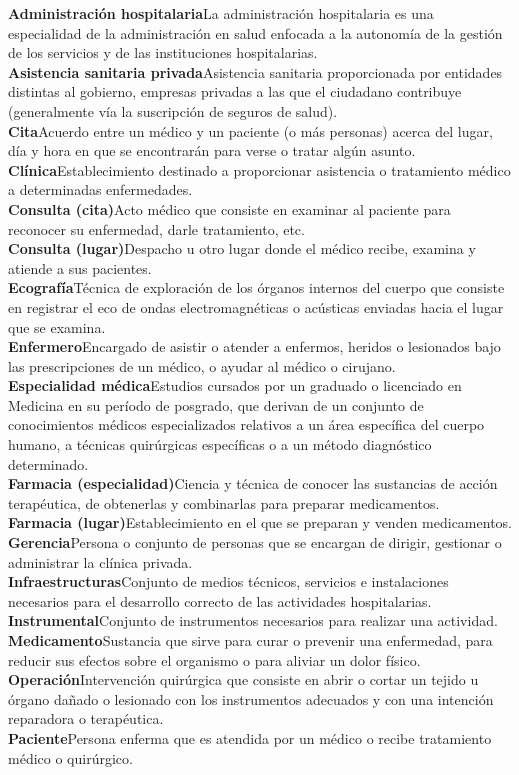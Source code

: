 \documentclass[12pt,a4paper]{article}
\newcommand{\term}[2]{\textbf{#1}\quad#2\\}
\begin{document}
	\term{Administración hospitalaria}{La administración hospitalaria es una especialidad de la administración en salud enfocada a la autonomía de la gestión de los servicios y de las instituciones hospitalarias.}
	\term{Asistencia sanitaria privada}{Asistencia sanitaria proporcionada por entidades distintas al gobierno, empresas privadas a las que el ciudadano contribuye (generalmente vía la suscripción de seguros de salud).}
	\term{Cita}{Acuerdo entre un médico y un paciente (o más personas) acerca del lugar, día y hora en que se encontrarán para verse o tratar algún asunto.}
	\term{Clínica}{Establecimiento destinado a proporcionar asistencia o tratamiento médico a determinadas enfermedades.}
	\term{Consulta (cita)}{Acto médico que consiste en examinar al paciente para reconocer su enfermedad, darle tratamiento, etc.}
	\term{Consulta (lugar)}{Despacho u otro lugar donde el médico recibe, examina y atiende a sus pacientes.}
	\term{Ecografía}{Técnica de exploración de los órganos internos del cuerpo que consiste en registrar el eco de ondas electromagnéticas o acústicas enviadas hacia el lugar que se examina.}
	\term{Enfermero}{Encargado de asistir o atender a enfermos, heridos o lesionados bajo las prescripciones de un médico, o ayudar al médico o cirujano.}
	\term{Especialidad médica}{Estudios cursados por un graduado o licenciado en Medicina en su período de posgrado, que derivan de un conjunto de conocimientos médicos especializados relativos a un área específica del cuerpo humano, a técnicas quirúrgicas específicas o a un método diagnóstico determinado.}
	\term{Farmacia (especialidad)}{Ciencia y técnica de conocer las sustancias de acción terapéutica, de obtenerlas y combinarlas para preparar medicamentos.}
	\term{Farmacia (lugar)}{Establecimiento en el que se preparan y venden medicamentos.}
	\term{Gerencia}{Persona o conjunto de personas que se encargan de dirigir, gestionar o administrar la clínica privada.}
	\term{Infraestructuras}{Conjunto de medios técnicos, servicios e instalaciones necesarios para el desarrollo correcto de las actividades hospitalarias.}
	\term{Instrumental}{Conjunto de instrumentos necesarios para realizar una actividad.}
	\term{Medicamento}{Sustancia que sirve para curar o prevenir una enfermedad, para reducir sus efectos sobre el organismo o para aliviar un dolor físico.}
	\term{Operación}{Intervención quirúrgica que consiste en abrir o cortar un tejido u órgano dañado o lesionado con los instrumentos adecuados y con una intención reparadora o terapéutica.}
	\term{Paciente}{Persona enferma que es atendida por un médico o recibe tratamiento médico o quirúrgico.}
\end{document}
